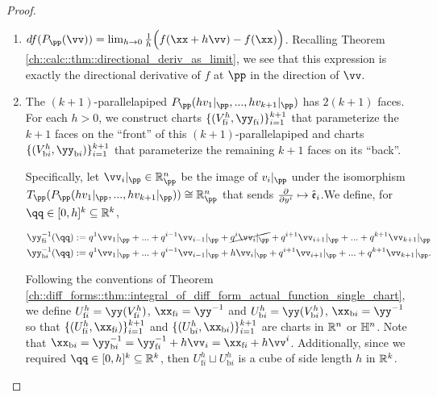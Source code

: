 \begin{proof}
    \newcommand{\Vfi}{V_{\text{f}i}^h}
    \newcommand{\Vbi}{V_{\text{b}i}^h}
    \newcommand{\Ufi}{U_{\text{f}i}^h}
    \newcommand{\Ubi}{U_{\text{b}i}^h}
    \newcommand{\yfi}{\yy_{\text{f}i}}
    \newcommand{\ybi}{\yy_{\text{b}i}}
    \newcommand{\xfi}{\xx_{\text{f}i}}
    \newcommand{\xbi}{\xx_{\text{b}i}}

    \mbox{} \\
    \begin{enumerate}
        \item $df(P_\pp(\vv)) = \lim_{h \rightarrow 0} \frac{1}{h}\Big( f(\xx + h\vv) - f(\xx) \Big)$. Recalling Theorem \ref{ch::calc::thm::directional_deriv_as_limit}, we see that this expression is exactly the directional derivative of $f$ at $\pp$ in the direction of $\vv$.
            
        \item The $(k + 1)$-parallelapiped $P_\pp(h v_1|_\pp, ..., h v_{k + 1}|_\pp)$ has $2(k + 1)$ faces. For each $h > 0$, we construct charts $\{(\Vfi, \yfi)\}_{i = 1}^{k + 1}$ that parameterize the $k + 1$ faces on the ``front'' of this $(k + 1)$-parallelapiped and charts $\{(\Vbi, \ybi)\}_{i = 1}^{k + 1}$ that parameterize the remaining $k + 1$ faces on its ``back''. 
        
        Specifically, let $\vv_i|_\pp \in \R^n_\pp$ be the image of $v_i|_\pp$ under the isomorphism $T_\pp(P_\pp(h v_1|_\pp, ..., h v_{k + 1}|_\pp)) \cong \R^n_\pp$ that sends $\frac{\partial}{\partial y^i} \mapsto \hat{\mathfrak{e}}_i$.We define, for $\qq \in [0, h]^k \subseteq \R^k$,
        
        \begin{align*}
            \yfi^{-1}(\qq) &:= q^1 \vv_1|_\pp + ... + q^{i - 1} \vv_{i - 1}|_\pp + \cancel{q^i \vv_i|_\pp} + q^{i + 1} \vv_{i + 1}|_\pp + ... + q^{k + 1} \vv_{k + 1}|_\pp \\
            \ybi^{-1}(\qq) &:= q^1 \vv_1|_\pp + ... + q^{i - 1} \vv_{i - 1}|_\pp + h \vv_i|_\pp + q^{i + 1} \vv_{i + 1}|_\pp + ... + q^{k + 1} \vv_{k + 1}|_\pp.
        \end{align*}
        
        Following the conventions of Theorem \ref{ch::diff_forms::thm::integral_of_diff_form_actual_function_single_chart}, we define $\Ufi = \yy(\Vfi)$, $\xfi = \yy^{-1}$ and $\Ubi = \yy(\Vbi)$, $\xbi = \yy^{-1}$ so that $\{(\Ufi, \xfi)\}_{i = 1}^{k + 1}$ and $\{(\Ubi, \xbi)\}_{i = 1}^{k + 1}$ are charts in $\mathbb{R}^n$ or $\mathbb{H}^n$. Note that $\xbi = \ybi^{-1} = \yfi^{-1} + h\vv_i = \xfi + h\vv^i$. Additionally, since we required $\qq \in [0, h]^k \subseteq \R^k$, then $\Ufi \sqcup \Ubi$ is a cube of side length $h$ in $\mathbb{R}^k$.
        

\end{enumerate}
\end{proof}
